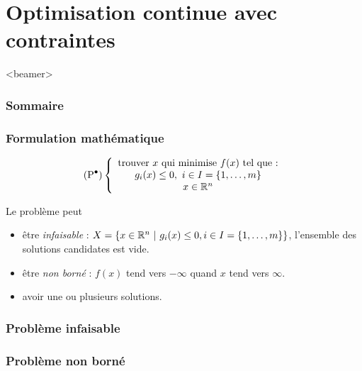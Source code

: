 \documentclass{beamer}
\newcommand{\R}{{\ensuremath\mathbb{R}}}
\begin{document}
\section{Optimisation continue avec contraintes}

\begin{frame}<beamer>
  \frametitle{Sommaire}
  \tableofcontents[currentsection]
\end{frame}

\begin{frame}
  \frametitle{Formulation mathématique}

  \[
  (\text{P}^\bullet) \left\{
  \begin{array}{c}
    \text{trouver} \ x \ \text{qui minimise} \ f(x) \ \text{tel que :} \\
    g_i(x) \leq 0, \ i \in I = \{1, \dots, m\} \\
    x \in \R^n
  \end{array}
  \right.
  \]

  \begin{block}{Le problème peut}
    \begin{itemize}
    \item être \emph{infaisable} :
      $X = \{ x \in \R^n \ | \ g_i(x) \leq 0, i \in I = \{1, \dots, m\} \}$,
      l'ensemble des solutions candidates est vide.
    \item être \emph{non borné} : $f(x)$ tend vers $-\infty$ quand $x$ tend vers $\infty$.
    \item avoir une ou plusieurs solutions. 
    \end{itemize}
  \end{block}
  
\end{frame}

\begin{frame}
  \frametitle{Problème infaisable}

\end{frame}

\begin{frame}
  \frametitle{Problème non borné}

\end{frame}
\end{document}
